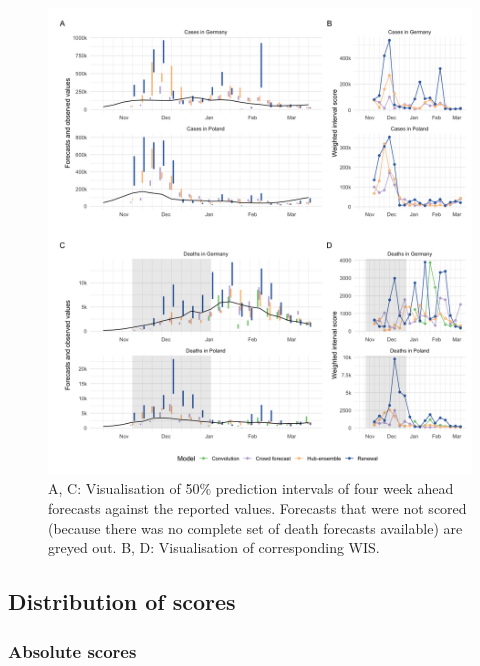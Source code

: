 \documentclass[10pt,letterpaper]{article} %
\begin{document}
\begin{figure}[H]
\includegraphics[width=1\linewidth,]{../analysis/plots/figure-forecasts-4} \caption{A, C: Visualisation of 50\% prediction intervals of four week ahead forecasts against the reported values. Forecasts that were not scored (because there was no complete set of death forecasts available) are greyed out. B, D: Visualisation of corresponding WIS.}\label{fig:forecasts-and-truth-4}
\end{figure}

\clearpage

\hypertarget{distribution-of-scores}{%
\subsection{Distribution of scores}\label{distribution-of-scores}}

\hypertarget{absolute-scores}{%
\subsubsection{Absolute scores}\label{absolute-scores}}
\end{document}
